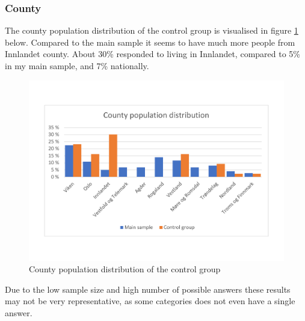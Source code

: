 \subsubsection{County}
The county population distribution of the control group is visualised in figure \ref{fig:county_controlgroup} below. Compared to the main sample it seems to have much more people from Innlandet county. About 30\% responded to living in Innlandet, compared to 5\% in my main sample, and 7\% nationally. 
\begin{figure}[!h]
    \centering
    \includegraphics[scale=0.40]{figures/diagrams/county_controlgroup.pdf}
    \caption{County population distribution of the control group}
    \label{fig:county_controlgroup}
\end{figure}
Due to the low sample size and high number of possible answers these results may not be very representative, as some categories does not even have a single answer. 

